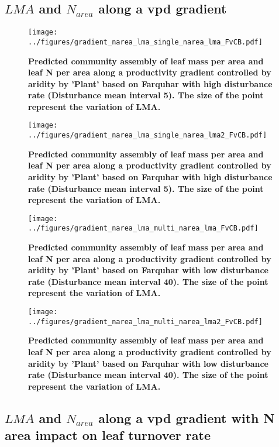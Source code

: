 \documentclass[a4paper,11pt]{article}
\begin{document}
\clearpage

\subsection{$LMA$ and $N_{area}$ along a vpd gradient}

\begin{figure}[ht]
\centering
\texttt{[image: ../figures/gradient\_narea\_lma\_single\_narea\_lma\_FvCB.pdf]}
\caption{\textbf{Predicted community assembly of leaf mass per area and leaf N per area along a productivity gradient controlled by aridity by 'Plant' based on Farquhar with high disturbance rate (Disturbance mean interval 5). The size of the point represent the variation of LMA.}
\label{fig:lma_nareaFh}}
\end{figure}

\begin{figure}[ht]
\centering
\texttt{[image: ../figures/gradient\_narea\_lma\_single\_narea\_lma2\_FvCB.pdf]}
\caption{\textbf{Predicted community assembly of leaf mass per area and leaf N per area along a productivity gradient controlled by aridity by 'Plant' based on Farquhar with high disturbance rate (Disturbance mean interval 5). The size of the point represent the variation of LMA.}
\label{fig:lma_nareaFh2}}
\end{figure}


\begin{figure}[ht]
\centering
\texttt{[image: ../figures/gradient\_narea\_lma\_multi\_narea\_lma\_FvCB.pdf]}
\caption{\textbf{Predicted community assembly of leaf mass per area and leaf N per area along a productivity gradient controlled by aridity by 'Plant' based on Farquhar with low disturbance rate (Disturbance mean interval 40). The size of the point represent the variation of LMA.}
\label{fig:lma_nareaFl}}
\end{figure}

\begin{figure}[ht]
\centering
\texttt{[image: ../figures/gradient\_narea\_lma\_multi\_narea\_lma2\_FvCB.pdf]}
\caption{\textbf{Predicted community assembly of leaf mass per area and leaf N per area along a productivity gradient controlled by aridity by 'Plant' based on Farquhar with low disturbance rate (Disturbance mean interval 40). The size of the point represent the variation of LMA.}
\label{fig:lma_nareaFl2}}
\end{figure}


\clearpage

\subsection{$LMA$ and $N_{area}$ along a vpd gradient with N area impact on leaf turnover rate}
\end{document}
